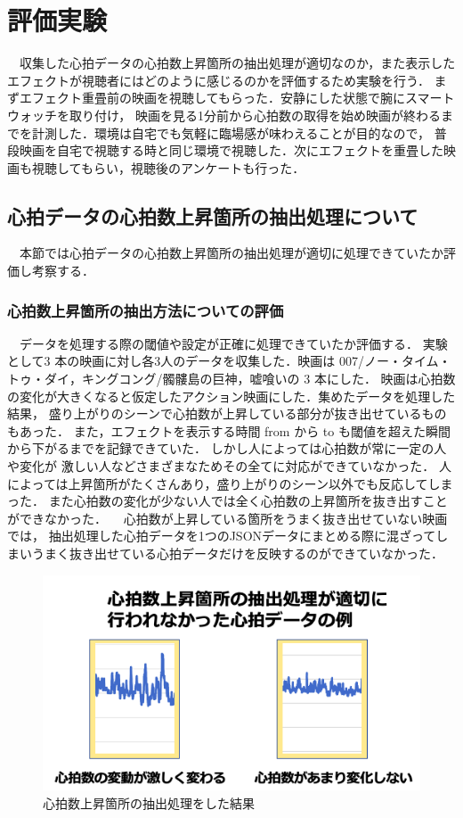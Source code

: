 \thispagestyle{myheadings}
\chapter{評価実験}

　収集した心拍データの心拍数上昇箇所の抽出処理が適切なのか，また表示したエフェクトが視聴者にはどのように感じるのかを評価するため実験を行う．
まずエフェクト重畳前の映画を視聴してもらった．安静にした状態で腕にスマートウォッチを取り付け，
映画を見る1分前から心拍数の取得を始め映画が終わるまでを計測した．環境は自宅でも気軽に臨場感が味わえることが目的なので，
普段映画を自宅で視聴する時と同じ環境で視聴した．次にエフェクトを重畳した映画も視聴してもらい，視聴後のアンケートも行った．

\section{心拍データの心拍数上昇箇所の抽出処理について}
　本節では心拍データの心拍数上昇箇所の抽出処理が適切に処理できていたか評価し考察する．

\subsection{心拍数上昇箇所の抽出方法についての評価}
　データを処理する際の閾値や設定が正確に処理できていたか評価する．
実験として3 本の映画に対し各3人のデータを収集した．映画は 007/ノー・タイム・トゥ・ダイ，キングコング/髑髏島の巨神，嘘喰いの 3 本にした．
映画は心拍数の変化が大きくなると仮定したアクション映画にした．集めたデータを処理した結果，
盛り上がりのシーンで心拍数が上昇している部分が抜き出せているものもあった．
また，エフェクトを表示する時間 from から to も閾値を超えた瞬間から下がるまでを記録できていた．
しかし人によっては心拍数が常に一定の人や変化が 激しい人などさまざまなためその全てに対応ができていなかった．
人によっては上昇箇所がたくさんあり，盛り上がりのシーン以外でも反応してしまった．
また心拍数の変化が少ない人では全く心拍数の上昇箇所を抜き出すことができなかった．
　心拍数が上昇している箇所をうまく抜き出せていない映画では，
抽出処理した心拍データを1つのJSONデータにまとめる際に混ざってしまいうまく抜き出せている心拍データだけを反映するのができていなかった．

\begin{figure}[H]
    \centering
    \includegraphics[width=13cm]{images/chapter4/miss.png}
    \caption{心拍数上昇箇所の抽出処理をした結果}
\end{figure}


